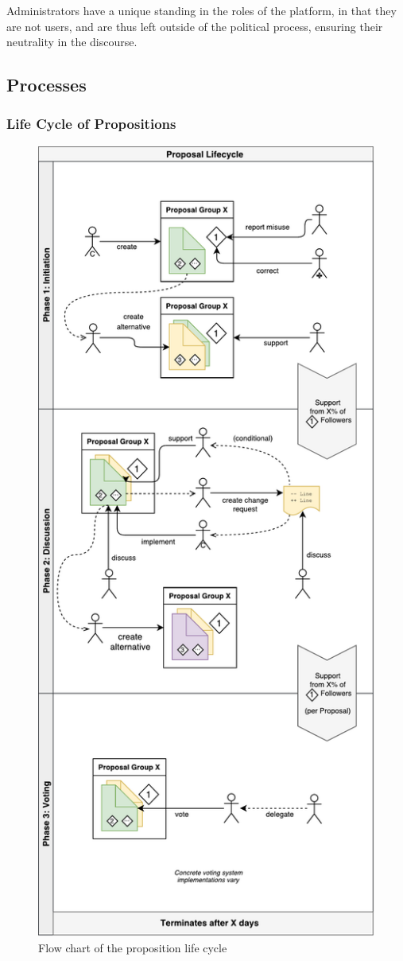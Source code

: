 Administrators have a unique standing in the roles of the platform, in that they are not users, and are thus left outside of the political process, ensuring their neutrality in the discourse.

\subsection{Processes}

\subsubsection{Life Cycle of Propositions}
\label{ssec:Model_Propositions_Life}
\begin{figure}[H]
\centering
\includegraphics[height=0.6\paperheight]{img/lifecycle_flow_v0.pdf}
\caption{Flow chart of the proposition life cycle}
\label{fig:proplife}
\end{figure}

